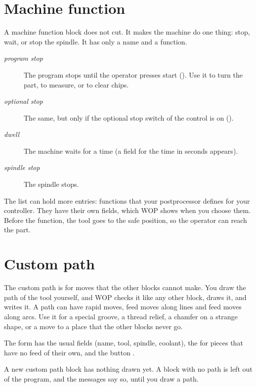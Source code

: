 \section{Machine function}\label{sec:blocks:function}


A machine function block does not cut. It makes the machine do one thing: stop, wait, or stop the spindle. It has only a name and a function.

\begin{description}
\item[\emph{program stop}] The program stops until the operator presses start (). Use it to turn the part, to measure, or to clear chips.
\item[\emph{optional stop}] The same, but only if the optional stop switch of the control is on ().
\item[\emph{dwell}] The machine waits for a time (a field for the time in seconds appears).
\item[\emph{spindle stop}] The spindle stops.
\end{description}

The list can hold more entries: functions that your postprocessor defines for your controller. They have their own fields, which WOP shows when you choose them. Before the function, the tool goes to the safe position, so the operator can reach the part.

\section{Custom path}\label{sec:blocks:path}


The custom path is for moves that the other blocks cannot make. You draw the path of the tool yourself, and WOP checks it like any other block, draws it, and writes it. A path can have rapid moves, feed moves along lines and feed moves along arcs. Use it for a special groove, a thread relief, a chamfer on a strange shape, or a move to a place that the other blocks never go.

The form has the usual fields (name, tool, spindle, coolant), the  for pieces that have no feed of their own, and the button .

A new custom path block has nothing drawn yet. A block with no path is left out of the program, and the messages say so, until you draw a path.

